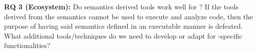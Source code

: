 \textbf{RQ 3 (Ecosystem):} Do semantics derived tools work well for \CDSSs{}?
If the tools derived from the semantics cannot be used to execute and analyze
\CDSS{} code, then the purpose of having said semantics defined in an executable
manner is defeated. What additional tools/techniques do we need to develop or
adapt for \CDSS{}-specific functionalities?

